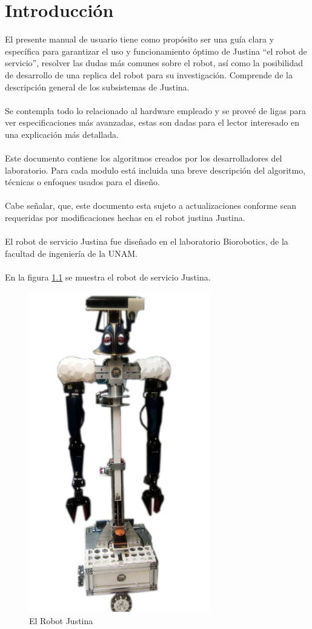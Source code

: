 \documentclass[user_manual.tex]{subfiles}
\begin{document}
\chapter{Introducción}

El presente manual de usuario tiene como propósito ser una guía clara y específica para garantizar el uso y funcionamiento óptimo de Justina ``el robot de servicio'', resolver las dudas más comunes sobre el robot, así como la posibilidad de desarrollo de una replica del robot para su investigación. Comprende de la descripción general de los subsistemas de Justina.\\
\\
Se contempla todo lo relacionado al hardware empleado y se proveé de ligas para ver especificaciones más avanzadas, estas son dadas para el lector interesado en una explicación más detallada.\\
\\
Este documento contiene los algoritmos creados por los desarrolladores del laboratorio. Para cada modulo está incluida una breve descripción del algoritmo, técnicas o enfoques usados para el diseño.\\
\\
Cabe señalar, que, este documento esta sujeto a actualizaciones conforme sean requeridas por modificaciones hechas en el robot justina Justina.\\
\\
El robot de servicio Justina fue diseñado en el laboratorio Biorobotics, de la facultad de ingeniería de la UNAM.\\
\\
En la figura \ref{fig:introduction:Justina} se muestra el robot de servicio Justina.

\begin{figure}[H]
\centering
\includegraphics[width=0.7\textwidth]{Figures/Introduction/Justina.png}
\caption{El Robot Justina}
\label{fig:introduction:Justina}
\end{figure}
\pagebreak
\end{document}
